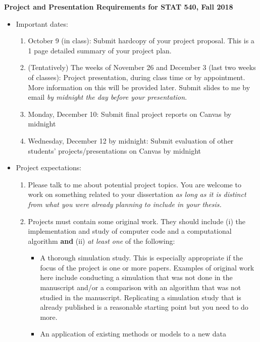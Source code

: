 \documentclass[10pts]{article}
\begin{document}
\pagestyle{empty}
\Large
\begin{center}
{\bf  Project and Presentation Requirements for STAT 540, Fall 2018}\\
\end{center}
\normalsize
\begin{itemize}
\item Important dates: 
\begin{enumerate}
\item October 9 (in class): Submit hardcopy of your project proposal.
  This is a 1 page detailed summary of your project plan.
\item (Tentatively) The weeks of November 26 and December 3 (last two weeks of classes): Project presentation,
  during class time or by appointment. More information on this will
  be provided later. Submit slides to me by email {\it by midnight the day before
    your presentation}.
\item Monday, December 10: Submit final project reports on Canvas by midnight
\item Wednesday, December 12 by midnight: Submit evaluation of other students' projects/presentations on Canvas by midnight
\end{enumerate}
\item Project expectations:
\begin{enumerate}
\item Please talk to me about potential project topics. You are
  welcome to work on something related to your dissertation {\it as
    long as it is distinct from what you were already planning to
    include in your thesis.}
\item Projects must contain some original work. They should
  include (i) the implementation and study of computer code and a
  computational algorithm {\bf and} (ii) {\it at least one} of the
  following:
\begin{itemize}
\item A thorough simulation study. This is especially appropriate if
  the focus of the project is one or more papers. Examples of
  original work here include conducting a simulation that was not done
  in the manuscript and/or a comparison with an algorithm that was not
  studied in the manuscript. Replicating a simulation study that is
  already published is a reasonable starting point but you need to do
  more.
\item An application of existing methods or models to a new data

\end{itemize}
\end{enumerate}
\end{itemize}
\end{document}

